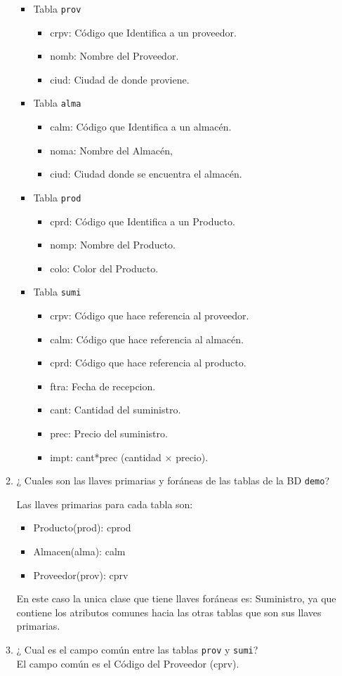\begin{enumerate}
\begin{enumerate}
\begin{itemize}
\item Tabla \texttt{prov}
\begin{itemize}
\item crpv: Código que Identifica a un proveedor.
\item nomb: Nombre del Proveedor.
\item ciud: Ciudad de donde proviene.
\end{itemize}
\item Tabla \texttt{alma}
\begin{itemize}
\item calm: Código que Identifica a un almacén.
\item noma: Nombre del Almacén,
\item ciud: Ciudad donde se encuentra el almacén.
\end{itemize}
\item Tabla \texttt{prod}
\begin{itemize}
\item cprd: Código que Identifica a un Producto.
\item nomp: Nombre del Producto.
\item colo: Color del Producto.
\end{itemize}
\item Tabla \texttt{sumi}
\begin{itemize}
\item crpv: Código que hace referencia al proveedor.
\item calm: Código que hace referencia al almacén.
\item cprd: Código que hace referencia al producto.
\item ftra: Fecha de recepcion.
\item cant: Cantidad del suministro.
\item prec: Precio del suministro.
\item impt: cant*prec (cantidad $\times$ precio).

\end{itemize}
\end{itemize}

\item ¿ Cuales son las llaves primarias y foráneas de las tablas  de la BD \texttt{demo}?

Las llaves primarias para cada tabla son:
\begin{itemize}
\item	Producto(prod): cprod
\item	Almacen(alma): calm
\item	Proveedor(prov): cprv
\end{itemize}
En este caso la unica clase que tiene llaves foráneas es:
	Suministro, ya que contiene los atributos comunes hacia las otras tablas que son sus llaves primarias.
\\
\item ¿ Cual es el campo común entre las tablas \texttt{prov} y \texttt{sumi}? \\
El campo común es el Código del Proveedor (cprv). \\


\end{enumerate}
\end{enumerate}
